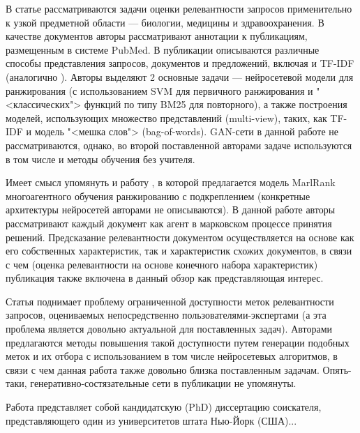 \documentclass{article}
\begin{document}
В статье \cite{DBLP:journals/corr/abs-1910-00314} рассматриваются задачи оценки релевантности запросов применительно к узкой
предметной области --- биологии, медицины и здравоохранения. В качестве документов авторы рассматривают аннотации к публикациям,
размещенным в системе PubMed. В публикации описываются различные способы представления запросов, документов и предложений, включая
и TF-IDF (аналогично \cite{DBLP:journals/corr/abs-2001-09896}). Авторы выделяют 2 основные задачи --- нейросетевой модели для
ранжирования (с использованием SVM для первичного ранжирования и "<классических"> функций по типу BM25 для повторного), а также
построения моделей, использующих множество представлений (multi-view), таких, как TF-IDF и модель "<мешка слов"> (bag-of-words).
GAN-сети в данной работе не рассматриваются, однако, во второй поставленной авторами задаче используются в том числе и методы
обучения без учителя.

Имеет смысл упомянуть и работу \cite{DBLP:journals/corr/abs-1909-06859}, в которой предлагается модель MarlRank многоагентного
обучения ранжированию с подкреплением (конкретные архитектуры нейросетей авторами не описываются). В данной работе авторы 
рассматривают каждый документ как агент в марковском процессе принятия решений. Предсказание релевантности документом 
осуществляется на основе как его собственных характеристик, так и характеристик схожих документов, в связи с чем (оценка 
релевантности на основе конечного набора характеристик) публикация также включена в данный обзор как представляющая интерес. 

Статья \cite{DBLP:journals/corr/abs-1907-08657} поднимает проблему ограниченной доступности меток релевантности запросов,
оцениваемых непосредственно пользователями-экспертами (а эта проблема является довольно актуальной для поставленных задач).
Авторами предлагаются методы повышения такой доступности путем генерации подобных меток и их отбора с использованием в 
том числе нейросетевых алгоритмов, в связи с чем данная работа также довольно близка поставленным задачам. Опять-таки, 
генеративно-состя\-зательные сети в публикации не упомянуты.

Работа \cite{DBLP:journals/corr/abs-1908-06132} представляет собой кандидатскую (PhD) диссертацию соискателя, представляющего
один из университетов штата Нью-Йорк (США)...


\printbibliography
\end{document}
